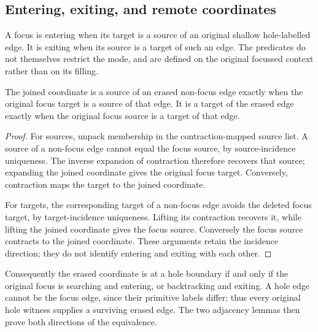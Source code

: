 \subsection{Entering, exiting, and remote coordinates}
\begin{definition}
\label{term:concrete-entering}
A focus is entering when its target is a source of an original shallow
hole-labelled edge. It is exiting when its source is a target of such an edge.
The predicates do not themselves restrict the mode, and are defined on the
original focussed context rather than on its filling.
\end{definition}
\begin{lemma}
The joined coordinate is a source of an erased non-focus edge exactly when
the original focus target is a source of that edge. It is a target of the erased
edge exactly when the original focus source is a target of that edge.
\end{lemma}
\begin{proof}
For sources, unpack membership in the contraction-mapped source list. A source
of a non-focus edge cannot equal the focus source, by source-incidence
uniqueness. The inverse expansion of contraction therefore recovers that source;
expanding the joined coordinate gives the original focus target. Conversely,
contraction maps the target to the joined coordinate.

For targets, the corresponding target of a non-focus edge avoids the deleted
focus target, by target-incidence uniqueness. Lifting its contraction recovers
it, while lifting the joined coordinate gives the focus source. Conversely the
focus source contracts to the joined coordinate. These arguments retain the
incidence direction; they do not identify entering and exiting with each other.
\end{proof}
Consequently the erased coordinate is at a hole boundary if and only if the
original focus is searching and entering, or backtracking and exiting. A hole
edge cannot be the focus edge, since their primitive labels differ; thus every
original hole witness supplies a surviving erased edge. The two adjacency
lemmas then prove both directions of the equivalence.

